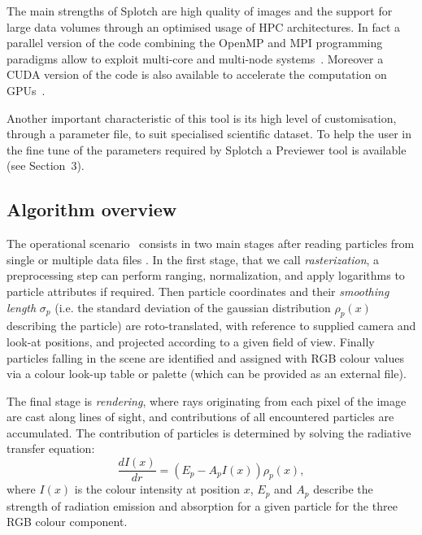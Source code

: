 \documentclass{egpubl}
\begin{document}
The main strengths of Splotch are high quality of images and the support for large data volumes through an optimised usage of HPC architectures. In fact a parallel version of the code combining the OpenMP and MPI programming paradigms allow to exploit multi-core and multi-node systems~\cite{JKR*10}. Moreover a CUDA version of the code is also available to accelerate the computation on GPUs~\cite{RGD*14}. 

Another important characteristic of this tool is its high level of customisation, through a parameter file, to suit specialised scientific dataset. To help the user in the fine tune of the parameters required by Splotch a Previewer tool is available (see Section~3).

\subsection{Algorithm overview }

The operational scenario~\cite{DRGI08} consists in two main stages after reading particles from single or multiple data files . 
In the first stage, that we call \textit{rasterization}, a preprocessing step can perform ranging, normalization, and apply logarithms to particle attributes if required. Then particle coordinates and their \textit{smoothing length} $\sigma_p$ (i.e. the standard deviation of the gaussian distribution $\rho_p(x)$ describing the particle) are roto-translated, with reference to supplied camera and look-at positions, and projected according to a given field of view. Finally particles falling in the scene are identified and assigned with RGB colour values via a colour look-up table or palette (which can be provided as an external file).

The final stage is \textit{rendering}, where rays originating from each pixel of the image are cast along lines of sight, and contributions of all encountered particles are accumulated. The contribution of particles is determined by solving the radiative transfer equation:
\begin{equation}\label{rad}
 \frac{d I(x)}{dr}=( E_p- A_p I(x))\rho_p(x),
\end{equation}
where $I(x)$ is the colour intensity at position $x$, $E_p$ and $A_p$ describe the strength of radiation emission and absorption for a given particle for the three RGB colour component.

\end{document}

